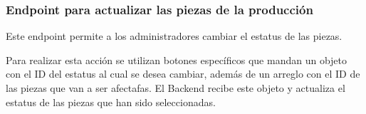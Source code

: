 \subsubsection{Endpoint para actualizar las piezas de la producción}
Este endpoint permite a los administradores cambiar el estatus de las piezas. 

Para realizar esta acción se utilizan botones específicos que mandan un objeto con el ID del estatus al cual se desea cambiar, además de un arreglo con el ID de las piezas que van a ser afectafas. El Backend recibe este objeto y actualiza el estatus de las piezas que han sido seleccionadas.
